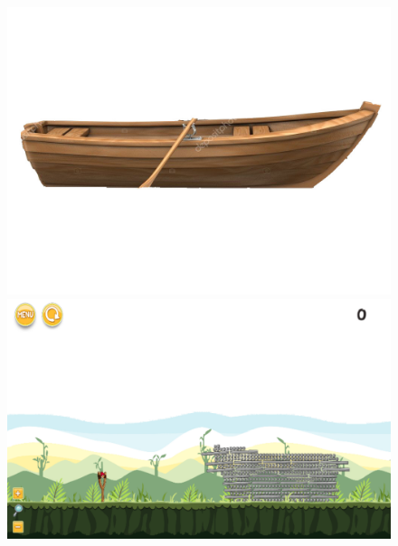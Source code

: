 \documentclass{dalthesis}
\begin{document}
\begin{figure}
  \includegraphics[width=\textwidth,height=\textheight,keepaspectratio]{levels/pictures/ships/rowboat.jpg}
  \includegraphics[width=\textwidth,height=\textheight,keepaspectratio]{levels/screenshots/ships/rowboat.png}
\end{figure}



\end{document}
